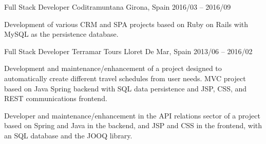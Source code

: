 \documentclass[]{awesome-cv}
\begin{document}
\begin{cventries}
	\cventry
	{Full Stack Developer}
	{Coditramuntana}
	{Girona, Spain}
	{2016/03 – 2016/09}
	{\begin{cvitems}
		\vspace{0.5mm}
		\item {Development of various CRM and SPA projects based on Ruby on Rails with MySQL as the persistence database.}
		\end{cvitems}}


	\cventry
	{Full Stack Developer}
	{Terramar Tours}
	{Lloret De Mar, Spain}
	{2013/06 – 2016/02}
	{\begin{cvitems}
		\vspace{0.5mm}
		\item {Development and maintenance/enhancement of a project designed to automatically create different travel schedules from user needs. MVC project based on Java Spring backend with SQL data persistence and JSP, CSS, and REST communications frontend.}
  \item {Developer and maintenance/enhancement in the API relations sector of a project based on Spring and Java in the backend, and JSP and CSS in the frontend, with an SQL database and the JOOQ library.}
		\end{cvitems}}
\end{cventries}
\end{document}

